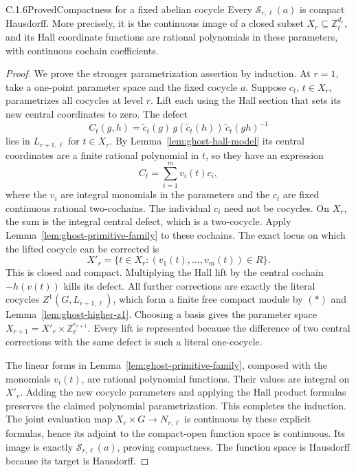 \begin{result}{C.1.6}{Proved}{Compactness for a fixed abelian cocycle}
\label{prop:ghost-compact-fibres}
Every \(\mathscr S_{r,\ell}(a)\) is compact Hausdorff. More
precisely, it is the continuous image of a closed subset
\(X_r\subseteq\mathbb Z_\ell^{d_r}\), and its Hall coordinate
functions are rational polynomials in these parameters, with
continuous cochain coefficients.
\end{result}
\begin{proof}
We prove the stronger parametrization assertion by induction.
At \(r=1\), take a one-point parameter space and the fixed
cocycle \(a\). Suppose \(c_t\), \(t\in X_r\), parametrizes
all cocycles at level \(r\). Lift each using the Hall section
that sets its new central coordinates to zero. The defect
\[
 C_t(g,h)=\widetilde c_t(g)\,
          g(\widetilde c_t(h))\,
          \widetilde c_t(gh)^{-1}
\]
lies in \(L_{r+1,\ell}\) for \(t\in X_r\). By
Lemma~\ref{lem:ghost-hall-model} its central coordinates are a
finite rational polynomial in \(t\), so they have an expression
\[
                  C_t=\sum_{i=1}^m v_i(t)c_i,
\]
where the \(v_i\) are integral monomials in the parameters and
the \(c_i\) are fixed continuous rational two-cochains.
The individual \(c_i\) need not be cocycles. On \(X_r\), the
sum is the integral central defect, which is a two-cocycle.
Apply Lemma~\ref{lem:ghost-primitive-family} to these cochains.
The exact locus on which the lifted cocycle can be corrected is
\[
          X'_r=\{t\in X_r:(v_1(t),\ldots,v_m(t))\in R\}.
\]
This is closed and compact. Multiplying the Hall lift by the
central cochain \(-h(v(t))\) kills its defect. All further
corrections are exactly the literal cocycles
\(Z^1(G,L_{r+1,\ell})\), which form a finite free compact module
by \((\ast)\) and Lemma~\ref{lem:ghost-higher-z1}. Choosing a
basis gives the parameter space
\(X_{r+1}=X'_r\times\mathbb Z_\ell^{e_{r+1}}\).
Every lift is represented because the difference of two central
corrections with the same defect is such a literal one-cocycle.

The linear forms in Lemma~\ref{lem:ghost-primitive-family},
composed with the monomials \(v_i(t)\), are rational polynomial
functions. Their values are integral on \(X'_r\). Adding the
new cocycle parameters and applying the Hall product formulas
preserves the claimed polynomial parametrization. This completes
the induction. The joint evaluation map
\(X_r\times G\to N_{r,\ell}\) is continuous by these explicit
formulas, hence its adjoint to the compact-open function space
is continuous. Its image is exactly
\(\mathscr S_{r,\ell}(a)\), proving compactness. The function
space is Hausdorff because its target is Hausdorff.
\end{proof}

